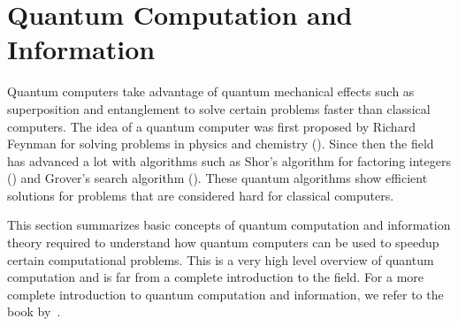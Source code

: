 \documentclass[a4paper,10pt]{article}
\begin{document}
\section{Quantum Computation and Information} \label{sec:quantum-computation-information}
Quantum computers take advantage of quantum mechanical effects such as superposition and entanglement to solve certain problems faster than classical computers.
The idea of a quantum computer was first proposed by Richard Feynman for solving problems in physics and chemistry (\cite{feynman-simulating}).
Since then the field has advanced a lot with algorithms such as Shor's algorithm for factoring integers (\cite{shor-factoring}) and Grover's search algorithm (\cite{grover-search}).
These quantum algorithms show efficient solutions for problems that are considered hard for classical computers.

This section summarizes basic concepts of quantum computation and information theory required to understand how quantum computers can be used to speedup certain computational problems.
This is a very high level overview of quantum computation and is far from a complete introduction to the field.
For a more complete introduction to quantum computation and information, we refer to the book by~\cite{nielsen-chuang}.
\end{document}
